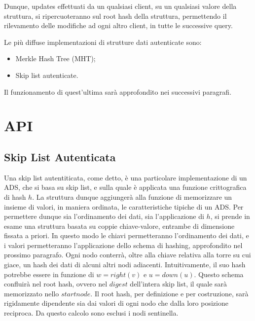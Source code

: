 		Dunque, updates effettuati da un qualsiasi client, su un qualsiasi valore della struttura, si ripercuoteranno sul root hash della struttura, permettendo il rilevamento delle modifiche ad ogni altro client, in tutte le successive query.
		
		Le più diffuse implementazioni di strutture dati autenticate sono:
		
		\begin{itemize}
			\item Merkle Hash Tree (MHT);
			\item Skip list autenticate.
		\end{itemize}
	
		Il funzionamento di quest'ultima sarà approfondito nei successivi paragrafi.
	
\section{API}

%	
	
	\subsection{Skip List Autenticata}
	
%		

	Una skip list autentiticata, come detto, è una particolare implementazione di un ADS, che si basa su skip list, e sulla quale è applicata una funzione crittografica di hash $ h $. La struttura dunque aggiungerà alla funzione di memorizzare un insieme di valori, in maniera ordinata, le caratteristiche tipiche di un ADS. Per permettere dunque sia l'ordinamento dei dati, sia l'applicazione di $ h $, si prende in esame una struttura  basata su coppie chiave-valore, entrambe di dimensione fissata a priori. In questo modo le chiavi permetteranno l'ordinamento dei dati, e i valori permetteranno l'applicazione dello schema di hashing, approfondito nel prossimo paragrafo. Ogni nodo conterrà, oltre alla chiave relativa alla torre su cui giace, un hash dei dati di alcuni altri nodi adiacenti. Intuitivamente, il suo hash potrebbe essere in funzione di $ w = right(v) $ e $ u = down(u) $. Questo schema confluirà nel root hash, ovvero nel $ digest $ dell'intera skip list, il quale sarà memorizzato nello $start node$.
	Il root hash, per definizione e per costruzione, sarà rigidamente dipendente sia dai valori di ogni nodo che dalla loro posizione reciproca. Da questo calcolo sono esclusi i nodi sentinella.
	
